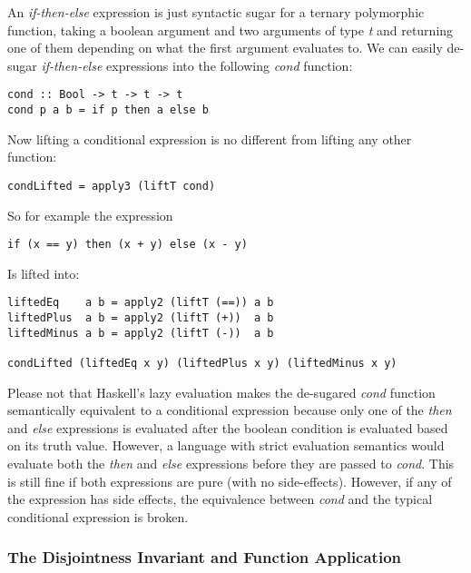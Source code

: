 \documentclass[11pt]{article} %
\begin{document}
\begin{exmp}

An \emph{if-then-else} expression is just syntactic sugar for a ternary polymorphic function, taking a boolean argument and two arguments of type \emph{t} and returning one of them depending on what the first argument evaluates to. We can easily de-sugar \emph{if-then-else} expressions into the following \emph{cond} function:

\begin{verbatim}
cond :: Bool -> t -> t -> t
cond p a b = if p then a else b
\end{verbatim}

Now lifting a conditional expression is no different from lifting any other function:

\begin{verbatim}
condLifted = apply3 (liftT cond)
\end{verbatim}

So for example the expression

\begin{verbatim}
if (x == y) then (x + y) else (x - y)
\end{verbatim}

Is lifted into:

\begin{verbatim}
liftedEq    a b = apply2 (liftT (==)) a b
liftedPlus  a b = apply2 (liftT (+))  a b
liftedMinus a b = apply2 (liftT (-))  a b

condLifted (liftedEq x y) (liftedPlus x y) (liftedMinus x y)
\end{verbatim}

Please not that Haskell's lazy evaluation makes the de-sugared \emph{cond} function semantically equivalent to a conditional expression because only one of the \emph{then} and \emph{else} expressions is evaluated after the boolean condition is evaluated based on its truth value. However, a language with strict evaluation semantics would evaluate both the \emph{then} and \emph{else} expressions before they are passed to \emph{cond}. This is still fine if both expressions are pure (with no side-effects). However, if any of the expression has side effects, the equivalence between \emph{cond} and the typical conditional expression is broken.

\end{exmp}

\subsubsection{The Disjointness Invariant and Function Application}
\end{document}
